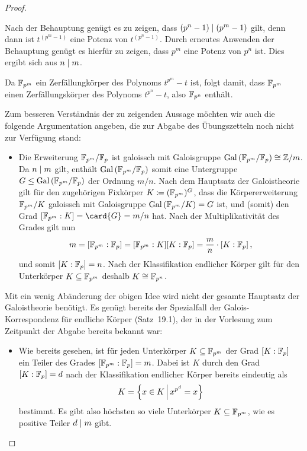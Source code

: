 \begin{proof}
\begin{itemize}
\begin{itemize}
          Nach der Behauptung genügt es zu zeigen, dass $(p^n - 1) \mathrel{|} (p^m - 1)$ gilt, denn dann ist $t^{(p^m - 1)}$ eine Potenz von $t^{(p^n - 1)}$.
          Durch erneutes Anwenden der Behauptung genügt es hierfür zu zeigen, dass $p^m$ eine Potenz von $p^n$ ist.
          Dies ergibt sich aus $n \mathrel{|} m$.
      \end{itemize}
      
      Da $\mathbb{F}_{p^m}$ ein Zerfällungkörper des Polynoms $t^{p^m} - t$ ist, folgt damit, dass $\mathbb{F}_{p^m}$ einen Zerfällungskörper des Polynoms $t^{p^n} - t$, also $\mathbb{F}_{p^n}$ enthält.
  \end{itemize}
  Zum besseren Verständnis der zu zeigenden Aussage möchten wir auch die folgende Argumentation angeben, die zur Abgabe des Übungszetteln noch nicht zur Verfügung stand:
  \begin{itemize}[resume]
    \item
      Die Erweiterung $\mathbb{F}_{p^m}/\mathbb{F}_{p}$ ist galoissch mit Galoisgruppe $\operatorname{Gal}{(}\mathbb{F}_{p^m}/\mathbb{F}_{p}) \cong \mathbb{Z}/m$.
      Da $n \mathrel{|} m$ gilt, enthält $\operatorname{Gal}{(}\mathbb{F}_{p^m}/\mathbb{F}_{p})$ somit eine Untergruppe $G \leq \operatorname{Gal}{(}\mathbb{F}_{p^m}/\mathbb{F}_{p})$ der Ordnung $m/n$.
      Nach dem Hauptsatz der Galoistheorie gilt für den zugehörigen Fixkörper $K \coloneqq (\mathbb{F}_{p^m})^G$, dass die Körpererweiterung $\mathbb{F}_{p^m}/K$ galoissch mit Galoisgruppe $\operatorname{Gal}{(}\mathbb{F}_{p^m}/K) = G$ ist, und (somit) den Grad $[\Finite{p^m} : K] = \card{G} = m/n$ hat.
      Nach der Multiplikativität des Grades gilt nun
      \[
          m
        = [\mathbb{F}_{p^m} : \mathbb{F}_{p}]
        = [\mathbb{F}_{p^m} : K] [K : \mathbb{F}_{p}]
        = \frac{m}{n} \cdot [K : \mathbb{F}_{p}] \,,
      \]
      und somit $[K : \mathbb{F}_{p}] = n$.
      Nach der Klassifikation endlicher Körper gilt für den Unterkörper $K \subseteq \mathbb{F}_{p^m}$ deshalb $K \cong \mathbb{F}_{p^n}$.
  \end{itemize}
  Mit ein wenig Abänderung der obigen Idee wird nicht der gesamte Hauptsatz der Galoistheorie benötigt.
  Es genügt bereits der Spezialfall der Galois-Korrespondenz für endliche Körper (Satz~19.1), der in der Vorlesung zum Zeitpunkt der Abgabe bereits bekannt war:
  \begin{itemize}[resume]
    \item
      Wie bereits gesehen, ist für jeden Unterkörper $K \subseteq \mathbb{F}_{p^m}$ der Grad $[K : \mathbb{F}_{p}]$ ein Teiler des Grades $[\mathbb{F}_{p^m} : \mathbb{F}_{p}] = m$.
      Dabei ist $K$ durch den Grad $[K : \mathbb{F}_{p}] = d$ nach der Klassifikation endlicher Körper bereits eindeutig als
      \[
          K
        = \left\{
            x \in K
          \suchthat*
            x^{p^d} = x
          \right\}
      \]
      bestimmt.
      Es gibt also höchsten so viele Unterkörper $K \subseteq \mathbb{F}_{p^m}$, wie es positive Teiler $d \mathrel{|} m$ gibt.
      

\end{itemize}
\end{proof}
